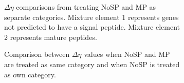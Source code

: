 \documentclass[11pt]{labbook}
\begin{document}
\begin{figure}
\begin{center}
\begin{subfigure}{0.6\textwidth}
\caption{$\Delta\eta$ comparisons from treating NoSP and MP as separate categories. Mixture element 1 represents genes not predicted to have a signal peptide. Mixture element 2 represents mature peptides.}
\end{subfigure}%
\end{center}
\begin{subfigure}{0.52\textwidth}
\caption{Comparison between $\Delta\eta$ values when NoSP and MP are treated as same category and when NoSP is treated as own category.}
\end{subfigure}%
\begin{subfigure}{0.52\textwidth}

\end{subfigure}
\end{figure}
\end{document}

